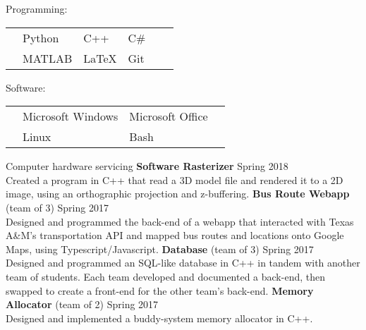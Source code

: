 \documentclass[12pt]{article}
\begin{document}
\begin{flushleft}
\begin{outline}[compactitem]
        \1 Programming:
        \\
        \vspace{-\baselineskip}\vspace{-\upspacelength}
        \begin{tabularx}{\textwidth}{X X X X X X}
            & Python   & C++ & C\#\upspace \\
            & MATLAB & \LaTeX & Git\upspace \\
        \end{tabularx}
        \vspace{-5px} \upspace
        \1 Software:
        \\
        \vspace{-\baselineskip}\vspace{-\upspacelength}
        \vspace{0.5em}
        \begin{tabularx}{\textwidth}{X X X X}
            & Microsoft Windows & Microsoft Office & \upspace \\
            & Linux & Bash & \\
        \end{tabularx}
        \1
        Computer hardware servicing
        \hfill\hfill
        \1 \textbf{Software Rasterizer} \hfill Spring 2018
        \\ Created a program in C++ that read a 3D model file and rendered it to a 2D image, using an orthographic projection and z-buffering.
        \1 \textbf{Bus Route Webapp} (team of 3) \hfill Spring 2017
        \\ Designed and programmed the back-end of a webapp that interacted with Texas A\&M's transportation API and mapped bus routes and locations onto Google Maps, using Typescript/Javascript.
        \1 \textbf{Database} (team of 3) \hfill Spring 2017
        \\ Designed and programmed an SQL-like database in C++ in tandem with another team of students. Each team developed and documented a back-end, then swapped to create a front-end for the other team's back-end.
        \1 \textbf{Memory Allocator} (team of 2) \hfill Spring 2017
        \\ Designed and implemented a buddy-system memory allocator in C++.


\end{outline}
\end{flushleft}
\end{document}
